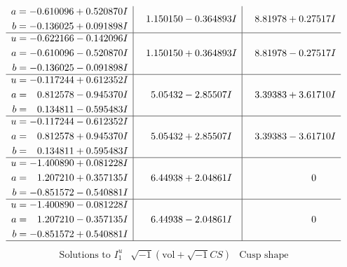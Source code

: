 \documentclass[1p]{elsarticle_modified}
\theoremstyle{definition}
\newcommand{\I}{\sqrt{-1}}
\begin{document}
$$\begin{array}{c|c|c}
\begin{aligned}
a &= -0.610096 + 0.520870 I \\
b &= -0.136025 + 0.091898 I\end{aligned}
 & \phantom{-}1.150150 - 0.364893 I & \phantom{-}8.81978 + 0.27517 I \\ \hline\begin{aligned}
u &= -0.622166 - 0.142096 I \\
a &= -0.610096 - 0.520870 I \\
b &= -0.136025 - 0.091898 I\end{aligned}
 & \phantom{-}1.150150 + 0.364893 I & \phantom{-}8.81978 - 0.27517 I \\ \hline\begin{aligned}
u &= -0.117244 + 0.612352 I \\
a &= \phantom{-}0.812578 - 0.945370 I \\
b &= \phantom{-}0.134811 - 0.595483 I\end{aligned}
 & \phantom{-}5.05432 - 2.85507 I & \phantom{-}3.39383 + 3.61710 I \\ \hline\begin{aligned}
u &= -0.117244 - 0.612352 I \\
a &= \phantom{-}0.812578 + 0.945370 I \\
b &= \phantom{-}0.134811 + 0.595483 I\end{aligned}
 & \phantom{-}5.05432 + 2.85507 I & \phantom{-}3.39383 - 3.61710 I \\ \hline\begin{aligned}
u &= -1.400890 + 0.081228 I \\
a &= \phantom{-}1.207210 + 0.357135 I \\
b &= -0.851572 - 0.540881 I\end{aligned}
 & \phantom{-}6.44938 + 2.04861 I & \phantom{-0.000000 } 0 \\ \hline\begin{aligned}
u &= -1.400890 - 0.081228 I \\
a &= \phantom{-}1.207210 - 0.357135 I \\
b &= -0.851572 + 0.540881 I\end{aligned}
 & \phantom{-}6.44938 - 2.04861 I & \phantom{-0.000000 } 0\\
 \hline 
 \end{array}$$\newpage$$\begin{array}{c|c|c}  
\text{Solutions to }I^u_{1}& \I (\text{vol} + \sqrt{-1}CS) & \text{Cusp shape}\\
 \hline 
\begin{aligned}

\end{aligned}
\end{array}$$
\end{document}
